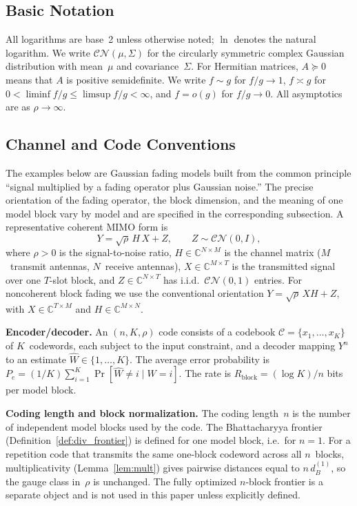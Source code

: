 \documentclass[lettersize,onecolumn]{IEEEtran}
\newcommand{\C}{\mathbb{C}}
\newcommand{\snr}{\rho}
\newcommand{\setC}{\mathcal{C}}
\begin{document}
\subsection{Basic Notation}

All logarithms are base~2 unless otherwise noted; $\ln$
denotes the natural logarithm. We write
$\mathcal{CN}(\mu,\Sigma)$ for the circularly symmetric complex
Gaussian distribution with mean~$\mu$ and covariance~$\Sigma$.
For Hermitian matrices, $A \succeq 0$ means that $A$ is positive
semidefinite. We write $f \sim g$ for $f/g \to 1$,
$f \asymp g$ for $0 < \liminf f/g \le \limsup f/g < \infty$, and
$f = o(g)$ for $f/g \to 0$. All asymptotics are as
$\snr\to\infty$.

\subsection{Channel and Code Conventions}\label{sec:channel_model}

The examples below are Gaussian fading models built from the common
principle ``signal multiplied by a fading operator plus Gaussian
noise.'' The precise orientation of the fading operator, the block
dimension, and the meaning of one model block vary by model and are
specified in the corresponding subsection. A representative coherent
MIMO form is
\begin{equation}\label{eq:general_channel}
Y = \sqrt{\snr}\,H\,X + Z, \qquad Z \sim \mathcal{CN}(0,I),
\end{equation}
where $\snr > 0$ is the signal-to-noise ratio,
$H \in \C^{N \times M}$ is the channel matrix ($M$~transmit
antennas, $N$~receive antennas), $X \in \C^{M \times T}$ is the
transmitted signal over one $T$-slot block, and
$Z \in \C^{N \times T}$ has i.i.d.\
$\mathcal{CN}(0,1)$ entries. For noncoherent block fading we use the
conventional orientation $Y=\sqrt{\snr}\,XH+Z$, with
$X\in\C^{T\times M}$ and $H\in\C^{M\times N}$.

\textbf{Encoder/decoder.}
An $(n, K, \snr)$ code consists of a codebook
$\setC = \{x_1,\dots,x_K\}$ of $K$~codewords, each subject to the
input constraint, and a decoder mapping $Y^n$ to an estimate
$\hat{W} \in \{1,\dots,K\}$. The average error probability is
$P_e = (1/K)\sum_{i=1}^K \Pr[\hat{W} \ne i \mid W = i]$. The
rate is $R_{\mathrm{block}} = (\log K)/n$ bits per model block.

\textbf{Coding length and block normalization.}
The coding length~$n$ is the number of independent model blocks used
by the code. The Bhattacharyya frontier
(Definition~\ref{def:div_frontier}) is defined for one model block,
i.e.\ for $n = 1$. For a repetition code that transmits the same one-block codeword
across all $n$~blocks, multiplicativity (Lemma~\ref{lem:mult}) gives
pairwise distances equal to $n\,d_B^{(1)}$, so the gauge class
in~$\snr$ is unchanged. The fully optimized $n$-block frontier is a
separate object and is not used in this paper unless explicitly
defined.
\end{document}
